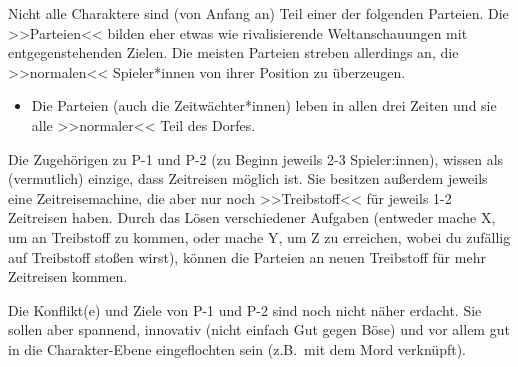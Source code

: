 Nicht alle Charaktere sind (von Anfang an) Teil einer der folgenden Parteien.
Die >>Parteien<< bilden eher etwas wie rivalisierende Weltanschauungen mit
entgegenstehenden Zielen. Die meisten Parteien streben allerdings an, die
>>normalen<< Spieler*innen von ihrer Position zu überzeugen.
\begin{itemize}
  \item[] Die Parteien (auch die Zeitwächter*innen) leben in allen drei Zeiten
    und sie alle >>normaler<< Teil des Dorfes.
\end{itemize}
Die Zugehörigen zu P-1 und P-2 (zu Beginn jeweils 2-3 Spieler:innen), wissen als
(vermutlich) einzige, dass Zeitreisen möglich ist. Sie besitzen außerdem jeweils
eine Zeitreisemachine, die aber nur noch >>Treibstoff<< für jeweils 1-2 Zeitreisen
haben. Durch das Lösen verschiedener Aufgaben (entweder mache X, um an
Treibstoff zu kommen, oder mache Y, um Z zu erreichen, wobei du zufällig auf
Treibstoff stoßen wirst), können die Parteien an neuen Treibstoff für mehr
Zeitreisen kommen.

Die Konflikt(e) und Ziele von P-1 und P-2 sind noch nicht näher erdacht. Sie
sollen aber spannend, innovativ (nicht einfach Gut gegen Böse) und vor allem gut
in die Charakter-Ebene eingeflochten sein (z.B.~mit dem Mord verknüpft).
